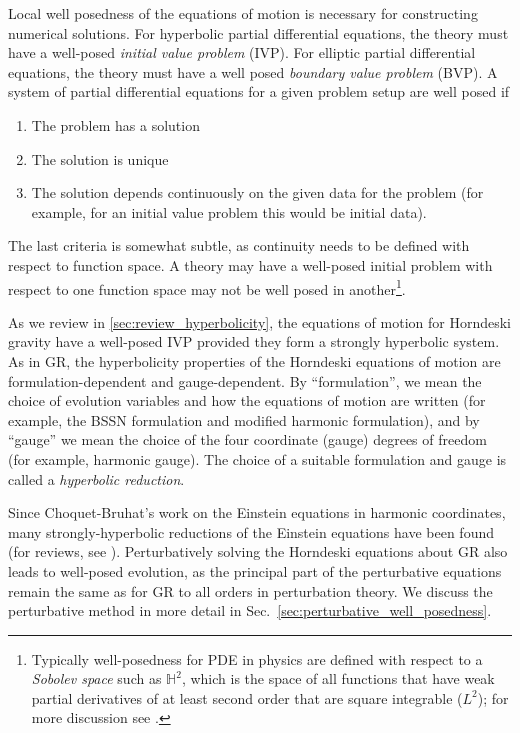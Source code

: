 \documentclass{ws-ijmpd}
\begin{document}
Local well posedness of the equations of motion is necessary for
constructing numerical solutions.
For hyperbolic partial differential equations,
the theory must have a well-posed \emph{initial value problem} (IVP).
For elliptic partial differential equations, the theory must
have a well posed \emph{boundary value problem} (BVP).
A system of partial differential equations for a given problem setup
are well posed if\cite{evans2010partial}
\begin{enumerate}
\item The problem has a solution 
\item The solution is unique
\item The solution depends continuously on the
   given data for the problem (for example, for an initial value problem
      this would be initial data).
\end{enumerate}
   The last criteria is somewhat subtle, as continuity needs to be 
defined with respect to function space.
A theory may have a well-posed initial problem with respect
to one function space may not be well posed in another\footnote{Typically 
well-posedness for PDE in physics are defined with respect to
a \emph{Sobolev space} such as $\mathbb{H}^2$,
which is the space of all
functions that have weak partial derivatives
of at least second order that are square integrable ($L^2$); 
for more discussion see 
.}.

As we review in \ref{sec:review_hyperbolicity}, the equations of motion
for Horndeski gravity have a well-posed IVP provided they form
a strongly hyperbolic system.
As in GR\cite{christodoulou2008mathematical,Sarbach:2012pr,Reula_review}, 
the hyperbolicity properties of the Horndeski equations
of motion are formulation-dependent and gauge-dependent.
By ``formulation'', we mean the choice of evolution variables 
and how the equations of motion are written
(for example, the BSSN formulation\cite{Shibata:1995we,Baumgarte:1998te} 
and modified harmonic 
formulation\cite{Friedrich:1996hq,Garfinkle:2001ni,Pretorius:2006tp}),
and by ``gauge'' we mean the choice
of the four coordinate (gauge) degrees of freedom
(for example, harmonic gauge\cite{choquet_bruhat_harmonic}).
The choice of a suitable formulation and gauge is called a
\emph{hyperbolic reduction}\cite{Friedrich:1996hq}.

Since Choquet-Bruhat's work on the Einstein equations in harmonic
coordinates\cite{choquet_bruhat_harmonic},
many strongly-hyperbolic reductions of the Einstein equations have
been found (for reviews, see ).
Perturbatively solving the Horndeski equations about
GR also leads to well-posed evolution, as the principal part of the
perturbative equations remain the same as for GR to all orders
in perturbation theory. We discuss the perturbative method
in more detail in Sec.~\ref{sec:perturbative_well_posedness}.
\end{document}
